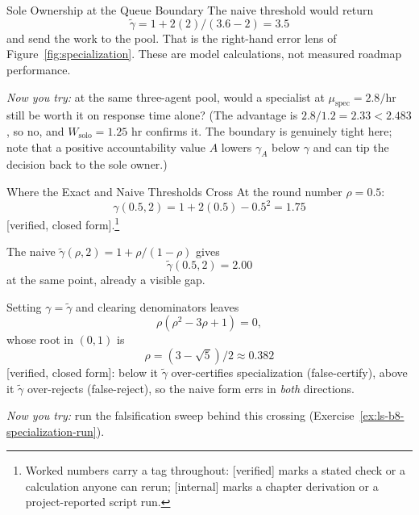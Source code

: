 \documentclass[11pt,a4paper]{article}
\theoremstyle{definition}
\theoremstyle{plain}
\begin{document}
\begin{pdexample}{Sole Ownership at the Queue Boundary}
The naive threshold would return
\[
\tilde\gamma = 1 + 2(2)/(3.6-2) = 3.5
\]
and send the work to the pool. That is the
right-hand error lens of Figure~\ref{fig:specialization}. These are model
calculations, not measured roadmap performance.

\emph{Now you try:} at the same three-agent pool, would a specialist at
$\mu_{\mathrm{spec}} = 2.8/\text{hr}$ still be worth it on response time alone?
(The advantage is $2.8/1.2 = 2.33 < 2.483$, so no, and $W_{\mathrm{solo}} = 1.25$ hr
confirms it. The boundary is genuinely tight here; note that a positive
accountability value $A$ lowers $\gamma_A$ below $\gamma$ and can tip the decision back to the sole owner.)
\end{pdexample}

\begin{pdexample}{Where the Exact and Naive Thresholds Cross}
\setlength{\parskip}{4pt plus 1pt}
At the round number $\rho=0.5$:
\[
\gamma(0.5,2)=1+2(0.5)-0.5^2=1.75
\]
[verified, closed form].\footnote{Worked numbers carry a tag throughout: [verified] marks a stated check or a calculation anyone can rerun; [internal] marks a chapter derivation or a project-reported script run.}

The naive $\tilde\gamma(\rho,2)=1+\rho/(1-\rho)$ gives
\[
\tilde\gamma(0.5,2)=2.00
\]
at the same point, already a visible gap.

Setting $\gamma=\tilde\gamma$ and clearing denominators leaves
\[
\rho(\rho^2-3\rho+1)=0,
\]
whose root in $(0,1)$ is
\[
\rho=(3-\sqrt5)/2\approx0.382
\]
[verified, closed form]: below it $\tilde\gamma$ over-certifies \mbox{specialization} (false-certify), above it $\tilde\gamma$ over-rejects (false-reject), so the naive form errs in \emph{both} directions.

\emph{Now you try:} run the falsification sweep behind this crossing (Exercise~\ref{ex:ls-b8-specialization-run}).
\end{pdexample}



\end{document}
